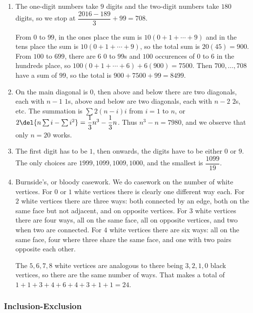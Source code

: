 \documentclass[10pt,paper=letter]{scrartcl}
\begin{document}
\begin{enumerate}
\item The one-digit numbers take $9$ digits and the two-digit numbers take $180$ digits, so we stop at $\dfrac{2016 - 189}3 + 99 = 708$. 

From $0$ to $99$, in the ones place the sum is $10(0 + 1 + \cdots + 9)$ and in the tens place the sum is $10(0 + 1 + \cdots + 9)$, so the total sum is $20(45) = 900$. From $100$ to $699$, there are $6$ $0$ to $99$s and $100$ occurences of $0$ to $6$ in the hundreds place, so $100(0 + 1 + \cdots + 6) + 6(900) = 7500$. Then $700, \ldots, 708$ have a sum of $99$, so the total is $900 + 7500 + 99 = 8499$.

\item On the main diagonal is $0$, then above and below there are two diagonals, each with $n-1$ $1$s, above and below are two diagonals, each with $n-2$ $2$s, etc. The summation is $\sum 2(n-i)i$ from $i = 1$ to $n$, or $2\del{n \sum i - \sum i^2} = \dfrac13 n^3 - \dfrac13n$. Thus $n^3 - n = 7980$, and we observe that only $n = 20$ works. 

\item The first digit has to be $1$, then onwards, the digits have to be either $0$ or $9$. The only choices are $1999, 1099, 1009, 1000$, and the smallest is $\dfrac{1099}{19}$.

\item Burnside's, or bloody casework. We do casework on the number of white vertices. For $0$ or $1$ white vertices there is clearly one different way each. For $2$ white vertices there are three ways: both connected by an edge, both on the same face but not adjacent, and on opposite vertices. For $3$ white vertices there are four ways, all on the same face, all on opposite vertices, and two when two are connected. For $4$ white vertices there are six ways: all on the same face, four where three share the same face, and one with two pairs opposite each other.

The $5, 6, 7, 8$ white vertices are analogous to there being $3, 2, 1, 0$ black vertices, so there are the same number of ways. That makes a total of $1 + 1 + 3 +4 + 6 + 4 + 3 + 1 + 1 = 24$.

\end{enumerate}

\subsubsection*{Inclusion-Exclusion}
\end{document}
